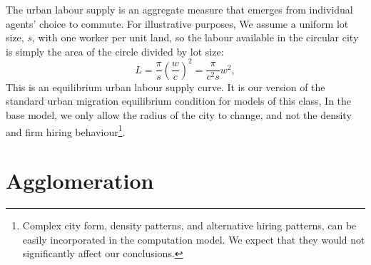The \gls{urban labour supply} is an \gls{aggregate} measure that emerges from individual agents' choice to commute. For illustrative purposes, We assume a uniform lot size, $s$, with one worker per unit land, so the labour available in the \gls{circular city} is simply the area of the circle divided by lot size: 
\begin{equation}
 L = \frac{\pi}{s} \left(\frac{w}{{c}}\right)^2
   =\frac{\pi}{{c}^2 s} w^2,
\label{eqn-labour-supply1}
\end{equation}
This is an equilibrium \gls{urban labour supply} curve. It is our version of the standard urban \gls{migration equilibrium}  condition for models of this class, %
In the base model, we only allow the radius of the city to change, and not the density 
and firm hiring behaviour\footnote{Complex city form, density patterns, and alternative hiring patterns, can be easily incorporated in the computation model. We expect that they would not significantly affect our conclusions.}. %

\section{Agglomeration}

